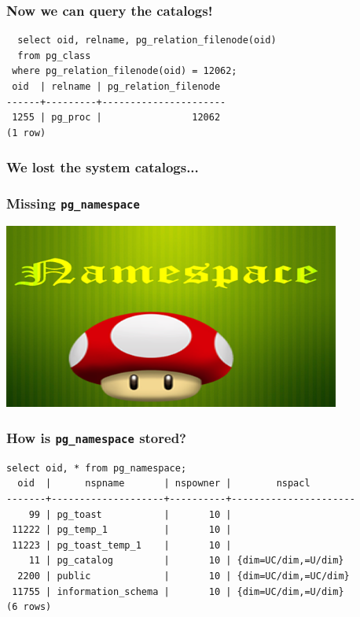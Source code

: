 \documentclass{beamer}
\begin{document}
\begin{frame}[fragile]
  \frametitle{Now we can query the catalogs!}
  
  \vfill

  \begin{verbatim}
  select oid, relname, pg_relation_filenode(oid)
  from pg_class
 where pg_relation_filenode(oid) = 12062;
 oid  | relname | pg_relation_filenode 
------+---------+----------------------
 1255 | pg_proc |                12062
(1 row)
  \end{verbatim}
\end{frame}

\begin{frame}[fragile]
  \frametitle{We lost the system catalogs...}

  \vfill
\end{frame}


\begin{frame}[fragile]
  \frametitle{Missing \texttt{pg\_namespace}}

  \vfill
  
  \begin{center}
    \includegraphics[height=2.4in]{namespace1.png}
  \end{center}
\end{frame}

\begin{frame}[fragile]
  \frametitle{How is \texttt{pg\_namespace} stored?}
  
  \begin{verbatim}
select oid, * from pg_namespace;
  oid  |      nspname       | nspowner |        nspacl        
-------+--------------------+----------+----------------------
    99 | pg_toast           |       10 | 
 11222 | pg_temp_1          |       10 | 
 11223 | pg_toast_temp_1    |       10 | 
    11 | pg_catalog         |       10 | {dim=UC/dim,=U/dim}
  2200 | public             |       10 | {dim=UC/dim,=UC/dim}
 11755 | information_schema |       10 | {dim=UC/dim,=U/dim}
(6 rows)
  \end{verbatim}
\end{frame}
\end{document}
